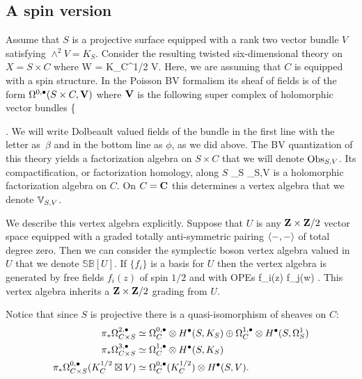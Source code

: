 \documentclass[11pt]{amsart}
\newcommand{\SB}{\mathbb{S}\mathbb{B}}
\begin{document}
\subsection{A spin version}

Assume that $S$ is a projective surface equipped with a rank two vector bundle $V$ satisfying $\wedge^2 V = K_S$.
Consider the resulting twisted six-dimensional theory on $X = S \times C$ where 
\beqn
W = K_C^{1/2} \boxtimes V.
\eeqn
Here, we are assuming that $C$ is equipped with a spin structure.
In the Poisson BV formalism its sheaf of fields is of the form $\Omega^{0,\bullet}(S \times C,\mathbf V)$ where $\mathbf V$ is the following super complex of holomorphic vector bundles
\beqn
\bV \colon \;\;\;\left\{
 \right.
\eeqn
We will write Dolbeault valued fields of the bundle in the first line with the letter as~$\beta$ and in the bottom line as $\phi$, as we did above.
The BV quantization of this theory yields a factorization algebra on $S \times C$ that we will denote ${\rm Obs}_{S,V}$.
Its compactification, or factorization homology, along $S$
\beqn
\int_S \Obs_{S,V} 
\eeqn
is a holomorphic factorization algebra on $C$.
On $C = \mathbf{C}$ this determines a vertex algebra that we denote $\mathbb V_{S,V}$.

We describe this vertex algebra explicitly.
Suppose that $U$ is any $\mathbf{Z} \times \mathbf{Z}/2$ vector space equipped with a graded totally anti-symmetric pairing $\langle-,-\rangle$ of total degree zero.
Then we can consider the symplectic boson vertex algebra valued in $U$ that we denote $\SB[U]$.
If $\{f_i\}$ is a basis for $U$ then the vertex algebra is generated by free fields $f_i(z)$ of spin $1/2$ and with OPEs
\beqn
f_i(z) f_j(w) \simeq {} .
\eeqn
This vertex algebra inherits a $\mathbf{Z} \times \mathbf{Z}/2$ grading from $U$.

Notice that since $S$ is projective there is a quasi-isomorphism of sheaves on $C$:
\begin{align*}
\pi_*\Omega^{2,\bullet}_{C \times S} & \simeq  \Omega^{0,\bullet}_C \otimes H^{\bullet} (S, K_S)  \oplus \Omega^{1,\bullet}_C \otimes H^\bullet(S, \Omega^1_S)  \\
\pi_* \Omega^{3,\bullet}_{C \times S} & \simeq \Omega^{1,\bullet}_C \otimes H^{\bullet} (S, K_S) \\
\pi_* \Omega^{0,\bullet}_{C \times S}( K_{C}^{1/2}\boxtimes V) & \simeq \Omega^{0,\bullet}_C(K^{1/2}_C) \otimes H^\bullet(S, V) .
\end{align*}
\end{document}
